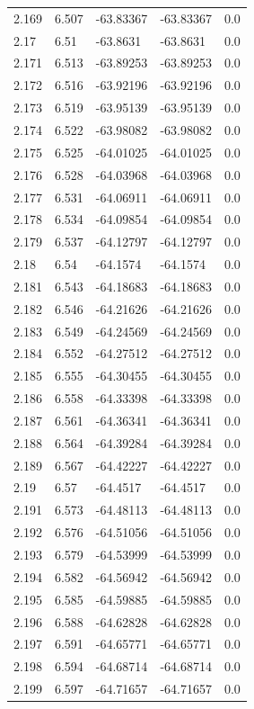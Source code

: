 \begin{tabular}{lllll}
2.169 & 6.507 & -63.83367 & -63.83367 & 0.0 \\
2.17 & 6.51 & -63.8631 & -63.8631 & 0.0 \\
2.171 & 6.513 & -63.89253 & -63.89253 & 0.0 \\
2.172 & 6.516 & -63.92196 & -63.92196 & 0.0 \\
2.173 & 6.519 & -63.95139 & -63.95139 & 0.0 \\
2.174 & 6.522 & -63.98082 & -63.98082 & 0.0 \\
2.175 & 6.525 & -64.01025 & -64.01025 & 0.0 \\
2.176 & 6.528 & -64.03968 & -64.03968 & 0.0 \\
2.177 & 6.531 & -64.06911 & -64.06911 & 0.0 \\
2.178 & 6.534 & -64.09854 & -64.09854 & 0.0 \\
2.179 & 6.537 & -64.12797 & -64.12797 & 0.0 \\
2.18 & 6.54 & -64.1574 & -64.1574 & 0.0 \\
2.181 & 6.543 & -64.18683 & -64.18683 & 0.0 \\
2.182 & 6.546 & -64.21626 & -64.21626 & 0.0 \\
2.183 & 6.549 & -64.24569 & -64.24569 & 0.0 \\
2.184 & 6.552 & -64.27512 & -64.27512 & 0.0 \\
2.185 & 6.555 & -64.30455 & -64.30455 & 0.0 \\
2.186 & 6.558 & -64.33398 & -64.33398 & 0.0 \\
2.187 & 6.561 & -64.36341 & -64.36341 & 0.0 \\
2.188 & 6.564 & -64.39284 & -64.39284 & 0.0 \\
2.189 & 6.567 & -64.42227 & -64.42227 & 0.0 \\
2.19 & 6.57 & -64.4517 & -64.4517 & 0.0 \\
2.191 & 6.573 & -64.48113 & -64.48113 & 0.0 \\
2.192 & 6.576 & -64.51056 & -64.51056 & 0.0 \\
2.193 & 6.579 & -64.53999 & -64.53999 & 0.0 \\
2.194 & 6.582 & -64.56942 & -64.56942 & 0.0 \\
2.195 & 6.585 & -64.59885 & -64.59885 & 0.0 \\
2.196 & 6.588 & -64.62828 & -64.62828 & 0.0 \\
2.197 & 6.591 & -64.65771 & -64.65771 & 0.0 \\
2.198 & 6.594 & -64.68714 & -64.68714 & 0.0 \\
2.199 & 6.597 & -64.71657 & -64.71657 & 0.0 \\

\end{tabular}

